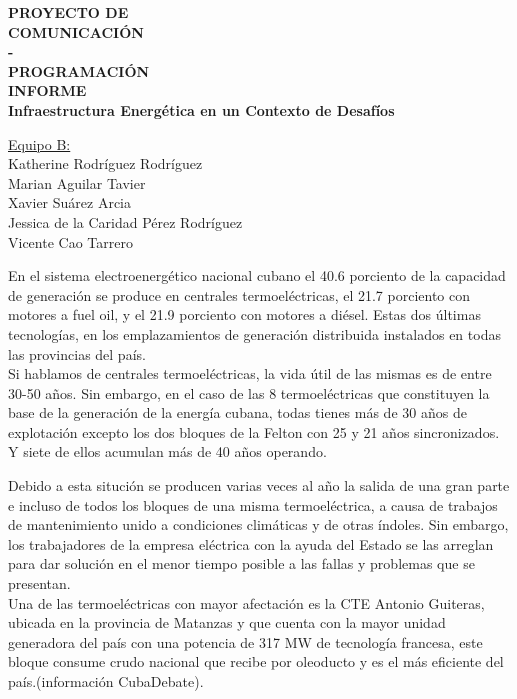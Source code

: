 \documentclass{article}
\begin{document}
\begin{titlepage}
    \centering
    \Huge{\bfseries{PROYECTO DE \\
    COMUNICACIÓN\\
    -\\
    PROGRAMACIÓN}}\\
    \vspace{3cm}
    \large{\bfseries{INFORME}}\\
    \vspace{1.5cm}
    \large{\bfseries{Infraestructura Energética en un Contexto de Desafíos}}
    
    \vspace{1.5cm}
    \underline{Equipo B:}\\
    Katherine Rodríguez Rodríguez\\
    Marian Aguilar Tavier\\
    Xavier Suárez Arcia\\
    Jessica de la Caridad Pérez Rodríguez\\
    Vicente Cao Tarrero
\end{titlepage}
En el sistema electroenergético nacional cubano el 40.6 porciento de la capacidad de generación se produce en centrales termoeléctricas, el 21.7 porciento con motores a fuel oil, y el 21.9 porciento con motores a diésel. Estas dos últimas tecnologías, en los emplazamientos de generación distribuida instalados en todas las provincias del país.\\
Si hablamos de centrales termoeléctricas, la vida útil de las mismas es de entre 30-50 años. Sin embargo, en el caso de las 8 termoeléctricas que constituyen la base de la generación de la energía cubana, todas tienes más de 30 años de explotación excepto los dos bloques de la Felton con 25 y 21 años sincronizados. Y siete de ellos acumulan más de 40 años operando.\\ 

\vspace{0.5cm}

Debido a esta situción se producen varias veces al año la salida de una gran parte e incluso de todos los bloques de una misma termoeléctrica, a causa de trabajos de mantenimiento unido a condiciones climáticas y de otras índoles. Sin embargo, los trabajadores de la empresa eléctrica con la ayuda del Estado se las arreglan para dar solución en el menor tiempo posible a las fallas y problemas que se presentan.\\
Una de las termoeléctricas con mayor afectación es la CTE Antonio Guiteras, ubicada en la provincia de Matanzas y que cuenta con la mayor unidad generadora del país con una potencia de 317 MW de tecnología francesa, este bloque consume crudo nacional que recibe por oleoducto y es el más eficiente del país.(información CubaDebate).\\
\end{document}
